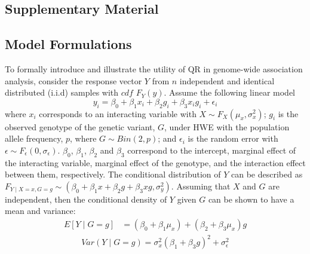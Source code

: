 \documentclass[12pt]{article}
\newcommand{\beginsupplement}{%
        \setcounter{table}{0}
        \renewcommand{\thetable}{S\arabic{table}}%
        \setcounter{figure}{0}
        \renewcommand{\thefigure}{S\arabic{figure}}%
     }
\begin{document}
\newpage
\begin{appendices}
\beginsupplement
\section{Supplementary Material}

\subsection{Model Formulations}
\indent \indent To formally introduce and illustrate the utility of QR in genome-wide association analysis, consider the response vector $Y$ from $n$ independent and identical distributed (i.i.d) samples with $cdf$ $F_{Y}\left(y\right)$. Assume the following linear model
\begin{equation} \label{mod1}
y_i = \beta_0 + \beta_1 x_i + \beta_2 g_i + \beta_3 x_i g_i + \epsilon_i
\end{equation}
where $x_i$ corresponds to an interacting variable with $X \sim F_X (\mu_x,\sigma_x^2)$; $g_i$ is the observed genotype of the genetic variant, $G$, under HWE with the population allele frequency, $p$, where $G \sim Bin(2, p)$; and $\epsilon_i$ is the random error with $\epsilon \sim F_{\epsilon} (0, \sigma_\epsilon)$. $\beta_0$, $\beta_1$, $\beta_2$ and $\beta_3$ correspond to the intercept, marginal effect of the interacting variable, marginal effect of the genotype, and the interaction effect between them, respectively. The conditional distribution of $Y$ can be described as $F_{Y \mid X=x,G=g} \sim \left(\beta_0 + \beta_1 x + \beta_2 g + \beta_3 xg, \sigma_y^2 \right)$. 
Assuming that $X$ and $G$ are independent, then the conditional density of $Y$ given $G$ can be shown to have a mean and variance: 
\begin{equation} 
\begin{split}
E \left[Y \mid G=g \right] &= (\beta_0 + \beta_1 \mu_x) + (\beta_2 + \beta_3 \mu_x)g 
\end{split}
\end{equation}
\begin{equation} \label{CondVar}
\begin{split}
Var(Y \mid G=g) = \sigma_x^2 (\beta_1 + \beta_3 g)^2 + \sigma_\epsilon^2
\end{split}
\end{equation}

\end{appendices}
\end{document}

